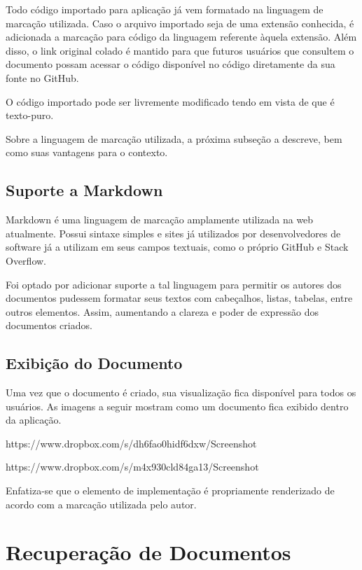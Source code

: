 Todo código importado para aplicação já vem formatado na linguagem de marcação utilizada. Caso o arquivo importado seja de uma extensão conhecida, é adicionada a marcação para código da linguagem referente àquela extensão. Além disso, o link original colado é mantido para que futuros usuários que consultem o documento possam acessar o código disponível no código diretamente da sua fonte no GitHub.

O código importado pode ser livremente modificado tendo em vista de que é texto-puro.


Sobre a linguagem de marcação utilizada, a próxima subseção a descreve, bem como suas vantagens para o contexto.

\subsection{Suporte a Markdown}

Markdown é uma linguagem de marcação amplamente utilizada na web atualmente. Possui sintaxe simples e sites já utilizados por desenvolvedores de software já a utilizam em seus campos textuais, como o próprio GitHub e Stack Overflow.

Foi optado por adicionar suporte a tal linguagem para permitir os autores dos documentos pudessem formatar seus textos com cabeçalhos, listas, tabelas, entre outros elementos. Assim, aumentando a clareza e poder de expressão dos documentos criados.

\subsection{Exibição do Documento}

Uma vez que o documento é criado, sua visualização fica disponível para todos os usuários. As imagens a seguir mostram como um documento fica exibido dentro da aplicação.

https://www.dropbox.com/s/dh6fao0hidf6dxw/Screenshot%

https://www.dropbox.com/s/m4x930cld84ga13/Screenshot%

Enfatiza-se que o elemento de implementação é propriamente renderizado de acordo com a marcação utilizada pelo autor.

\section{Recuperação de Documentos}

